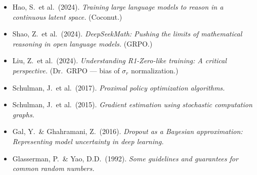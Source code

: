 \documentclass[11pt]{article}
\theoremstyle{definition}
\theoremstyle{remark}
\begin{document}
\begin{itemize}[topsep=2pt,itemsep=1pt,leftmargin=*]
\item Hao, S.\ et al.\ (2024). \emph{Training large language models to reason
      in a continuous latent space.}  (Coconut.)
\item Shao, Z.\ et al.\ (2024).  \emph{DeepSeekMath: Pushing the limits of
      mathematical reasoning in open language models.} (GRPO.)
\item Liu, Z.\ et al.\ (2024).  \emph{Understanding R1-Zero-like training:
      A critical perspective.} (Dr.\ GRPO --- bias of $\sigma_r$
      normalization.)
\item Schulman, J.\ et al.\ (2017).  \emph{Proximal policy optimization
      algorithms.}
\item Schulman, J.\ et al.\ (2015).  \emph{Gradient estimation using
      stochastic computation graphs.}
\item Gal, Y.\ \& Ghahramani, Z.\ (2016).  \emph{Dropout as a Bayesian
      approximation: Representing model uncertainty in deep learning.}
\item Glasserman, P.\ \& Yao, D.D.\ (1992).  \emph{Some guidelines and
      guarantees for common random numbers.}
\end{itemize}
\end{document}

